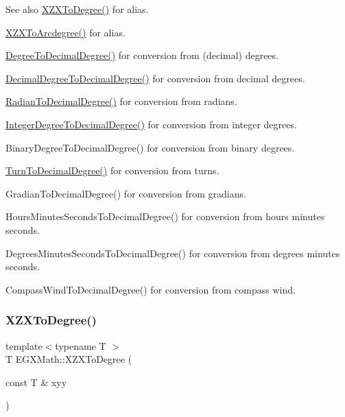 \begin{DoxySeeAlso}{See also}
\mbox{\hyperlink{group___e_g_x_math-_angle_conversions-_x_z_x_gaf91d111a3f3558dcd147d3832afc1fd6}{X\+Z\+X\+To\+Degree()}} for alias. 

\mbox{\hyperlink{group___e_g_x_math-_angle_conversions-_x_z_x_gade03c99ea870f58dcebd6307beed2364}{X\+Z\+X\+To\+Arcdegree()}} for alias. 

\mbox{\hyperlink{group___e_g_x_math-_angle_conversions-_degree_ga568afc1d436d425bf5d4edea584aee08}{Degree\+To\+Decimal\+Degree()}} for conversion from (decimal) degrees. 

\mbox{\hyperlink{group___e_g_x_math-_angle_conversions-_decimal_degree_gafccf9cd779903872887978ab9d79661f}{Decimal\+Degree\+To\+Decimal\+Degree()}} for conversion from decimal degrees. 

\mbox{\hyperlink{group___e_g_x_math-_angle_conversions-_radian_ga6d170f1882c32de53167c04524d05f67}{Radian\+To\+Decimal\+Degree()}} for conversion from radians. 

\mbox{\hyperlink{group___e_g_x_math-_angle_conversions-_integer_degree_gac219c3198508ba984d8d81d22831b27d}{Integer\+Degree\+To\+Decimal\+Degree()}} for conversion from integer degrees. 

Binary\+Degree\+To\+Decimal\+Degree() for conversion from binary degrees. 

\mbox{\hyperlink{group___e_g_x_math-_angle_conversions-_turn_ga79231536255e77fb7a158b99a30c1767}{Turn\+To\+Decimal\+Degree()}} for conversion from turns. 

Gradian\+To\+Decimal\+Degree() for conversion from gradians. 

Hours\+Minutes\+Seconds\+To\+Decimal\+Degree() for conversion from hours minutes seconds. 

Degrees\+Minutes\+Seconds\+To\+Decimal\+Degree() for conversion from degrees minutes seconds. 

Compass\+Wind\+To\+Decimal\+Degree() for conversion from compass wind. 
\end{DoxySeeAlso}
\mbox{\label{group___e_g_x_math-_angle_conversions-_x_z_x_gaf91d111a3f3558dcd147d3832afc1fd6}} 
\subsubsection{\texorpdfstring{X\+Z\+X\+To\+Degree()}{XZXToDegree()}}
{\footnotesize\ttfamily template$<$typename T $>$ \\
T E\+G\+X\+Math\+::\+X\+Z\+X\+To\+Degree (\begin{DoxyParamCaption}\item[{const T \&}]{xyy }\end{DoxyParamCaption})}



